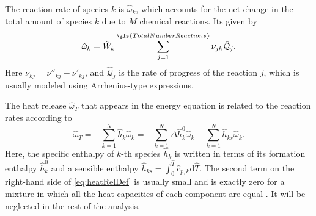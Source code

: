 The reaction rate of species $k$ is $\hat \omega_k$, which accounts for the net change in the total amount of species $k$ due to $M$ chemical reactions. Its given by
\begin{equation} \label{eq:reacRateDef}
	\hat \omega_k  = \hat W_k \sum_{j=1}^{\gls{TotalNumberReactions}}\nu_{jk}\hat{\mathcal{Q}}_j.
\end{equation}
Here $\nu_{kj} = \nu''_{kj} -\nu'_{kj}$, and $\hat{\mathcal{Q}}_j$ is the rate of progress of the reaction $j$, which is usually modeled using Arrhenius-type expressions.\newline

The heat release $\hat \omega_T$ that appears in the energy equation is related to the reaction rates according to
\begin{equation}\label{eq:heatRelDef}
	\hat \omega _T = - \sum_{k=1}^{N} \hat h_k\hat\omega_k = - \sum_{k=1}^{N}   \Delta \hat h_k^0 \hat\omega_k   - \sum_{k=1}^{N} \hat h_{ks} \hat\omega_k.
\end{equation}
Here, the specific enthalpy of $k$-th species $\hat h_k$  is written in terms of its formation enthalpy $\hat h_k^0$ and a sensible enthalpy $\hat h_{ks} =\int_{0}^{\hat{T}} \hat c_{p,k} \text{d}\hat{T} $. The second term on the right-hand side of \cref{eq:heatRelDef} is usually small and is exactly zero for a mixture in which all the heat capacities of each component are equal  \parencite{poinsotTheoreticalNumericalCombustion2011}. It will be neglected in the rest of the analysis.
\newline

